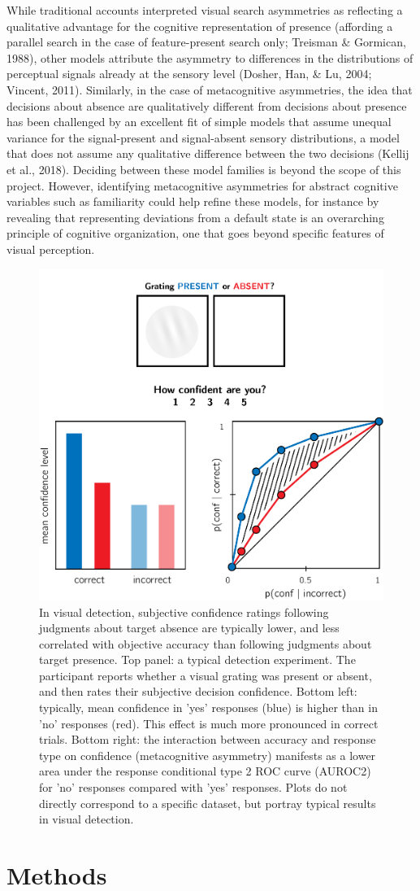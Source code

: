 \documentclass[12pt,twoside]{reedthesis}
\begin{document}
While traditional accounts interpreted visual search asymmetries as reflecting a qualitative advantage for the cognitive representation of presence (affording a parallel search in the case of feature-present search only; Treisman \& Gormican, 1988), other models attribute the asymmetry to differences in the distributions of perceptual signals already at the sensory level (Dosher, Han, \& Lu, 2004; Vincent, 2011). Similarly, in the case of metacognitive asymmetries, the idea that decisions about absence are qualitatively different from decisions about presence has been challenged by an excellent fit of simple models that assume unequal variance for the signal-present and signal-absent sensory distributions, a model that does not assume any qualitative difference between the two decisions (Kellij et al., 2018). Deciding between these model families is beyond the scope of this project. However, identifying metacognitive asymmetries for abstract cognitive variables such as familiarity could help refine these models, for instance by revealing that representing deviations from a default state is an overarching principle of cognitive organization, one that goes beyond specific features of visual perception.
\begin{figure}
\includegraphics[width=0.6\linewidth]{figure/asymmetry/asymmetry} \caption[Behavioural asymmetries in perceptual detection]{In visual detection, subjective confidence ratings following judgments about target absence are typically lower, and less correlated with objective accuracy than following judgments about target presence. Top panel: a typical detection experiment. The participant reports whether a visual grating was present or absent, and then rates their subjective decision confidence. Bottom left: typically, mean confidence in 'yes' responses (blue) is higher than in 'no' responses (red). This effect is much more pronounced in correct trials. Bottom right: the interaction between accuracy and response type on confidence (metacognitive asymmetry) manifests as a lower area under the response conditional type 2 ROC curve (AUROC2) for 'no' responses compared with 'yes' responses. Plots do not directly correspond to a specific dataset, but portray typical results in visual detection.}\label{fig:asymmetry-asymmetry}
\end{figure}
\hypertarget{methods-3}{%
\section{Methods}\label{methods-3}}
\end{document}
